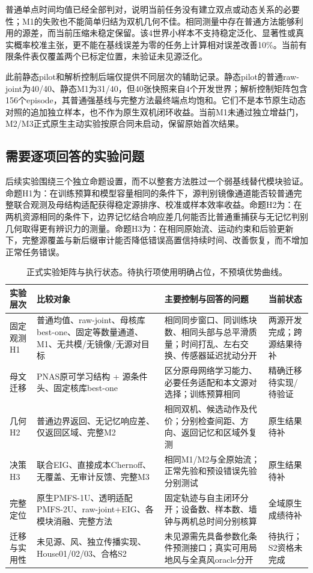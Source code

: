 普通单点时间均值已经全部判对，说明当前任务没有建立双点或动态关系的必要性；M1的失败也不能简单归结为双机几何不佳。相同测量中存在普通方法能够利用的源差，而当前压缩未稳定保留。该4世界小样本不支持稳定泛化、显著性或真实概率校准主张，更不能在基线误差为零的任务上计算相对误差改善10\%。当前有限条件表仅覆盖两个已标定位置，未验证未见源泛化。

此前静态pilot和解析控制后端仅提供不同层次的辅助记录。静态pilot的普通raw-joint为40/40、静态M1为31/40，但40张快照来自4个开发世界；解析控制矩阵包含156个episode，其普通强基线与完整方法最终端点均饱和。它们不是本节原生动态对照的追加独立样本，也不作为原生双机闭环收益。当前M1未通过独立增益门，M2/M3正式原生主动实验按原合同未启动，保留原始首次结果。

\subsection{需要逐项回答的实验问题}
后续实验围绕三个独立命题设置，而不以整套方法胜过一个弱基线替代模块验证。命题H1为：在训练预算和模型容量相同的条件下，源判别镜像通道能否较普通完整联合观测及母结构适配获得稳定源排序、校准或样本效率收益。命题H2为：在两机资源相同的条件下，边界记忆结合响应差几何能否比普通重捕获与无记忆判别几何取得更有辨识力的测量。命题H3为：在相同原始流、运动约束和后验更新下，完整源覆盖与新后缀审计能否降低错误高置信持续时间、改善恢复，而不增加正常任务错误。

\begin{table}[t]
\centering\small
\caption{正式实验矩阵与执行状态。待执行项使用明确占位，不预填优势曲线。}
\label{tab:plan}
\begin{tabularx}{\textwidth}{p{1.45cm}Y Y p{1.9cm}}
\toprule
实验层次 & 比较对象 & 主要控制与回答的问题 & 当前状态\\
\midrule
固定观测H1 & 普通均值、raw-joint、母核库best-one、固定等数量通道、M1、无共模/无镜像/无源对目标 & 相同同步窗口、同训练块数、相同头部与总平滑质量；时间打乱、左右交换、传感器延迟扰动分开 & 两源开发完成；跨源结果待补\\
母文迁移 & PNAS原可学习结构 + 源条件头、固定核库best-one & 区分原母网络学习能力、必要任务适配和本文源对选择；训练预算相同 & 精确迁移待实现/待验证\\
几何H2 & 普通边界返回、无记忆响应差、仅返回区域、完整M2 & 相同双机、候选动作及代价；分别检查间距、方向、返回记忆和区域外复测 & 原生结果待补\\
决策H3 & 联合EIG、直接成本Chernoff、无覆盖、无审计反馈、完整M3 & 相同M1/M2与全原始流；正常先验和预设错误先验分别测试 & 原生结果待补\\
完整定位 & 原生PMFS-1U、透明适配PMFS-2U、raw-joint+EIG、各模块消融、完整方法 & 固定轨迹与自主闭环分开；设备数、样本数、墙钟与两机总时间分别核算 & 全域原生成绩待补\\
迁移与实用性 & 未见源、风、独立传播实现、House01/02/03、合格S2 & 未见源需先具备参数化条件预测接口；真实可用局地风与全真风oracle分开 & 待执行；S2资格未完成\\
\bottomrule
\end{tabularx}
\end{table}

